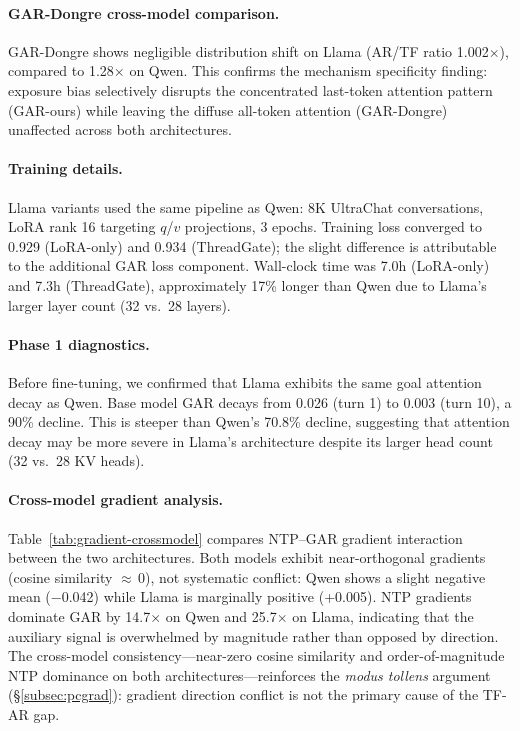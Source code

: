 

\paragraph{GAR-Dongre cross-model comparison.} GAR-Dongre shows negligible distribution shift on Llama (AR/TF ratio 1.002$\times$), compared to 1.28$\times$ on Qwen. This confirms the mechanism specificity finding: exposure bias selectively disrupts the concentrated last-token attention pattern (GAR-ours) while leaving the diffuse all-token attention (GAR-Dongre) unaffected across both architectures.

\paragraph{Training details.} Llama variants used the same pipeline as Qwen: 8K UltraChat conversations, LoRA rank 16 targeting $q$/$v$ projections, 3 epochs. Training loss converged to 0.929 (LoRA-only) and 0.934 (ThreadGate); the slight difference is attributable to the additional GAR loss component. Wall-clock time was 7.0h (LoRA-only) and 7.3h (ThreadGate), approximately 17\% longer than Qwen due to Llama's larger layer count (32 vs.\ 28 layers).

\paragraph{Phase 1 diagnostics.} Before fine-tuning, we confirmed that Llama exhibits the same goal attention decay as Qwen. Base model GAR decays from 0.026 (turn 1) to 0.003 (turn 10), a 90\% decline. This is steeper than Qwen's 70.8\% decline, suggesting that attention decay may be more severe in Llama's architecture despite its larger head count (32 vs.\ 28 KV heads).

\paragraph{Cross-model gradient analysis.} Table~\ref{tab:gradient-crossmodel} compares NTP--GAR gradient interaction between the two architectures. Both models exhibit near-orthogonal gradients (cosine similarity $\approx$\,0), not systematic conflict: Qwen shows a slight negative mean ($-$0.042) while Llama is marginally positive (+0.005). NTP gradients dominate GAR by 14.7$\times$ on Qwen and 25.7$\times$ on Llama, indicating that the auxiliary signal is overwhelmed by magnitude rather than opposed by direction. The cross-model consistency---near-zero cosine similarity and order-of-magnitude NTP dominance on both architectures---reinforces the \emph{modus tollens} argument (\S\ref{subsec:pcgrad}): gradient direction conflict is not the primary cause of the TF-AR gap.

